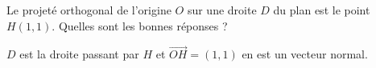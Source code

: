 \begin{question}
Le projeté orthogonal de l'origine $O$ sur une droite $D$ du plan est le point $H(1,1)$. Quelles sont les bonnes réponses ?
\begin{answers}  
\end{answers}
\begin{explanations}
$D$ est la droite passant par $H$ et $\overrightarrow{OH}=(1,1)$ en est un vecteur normal.
\end{explanations}
\end{question}

